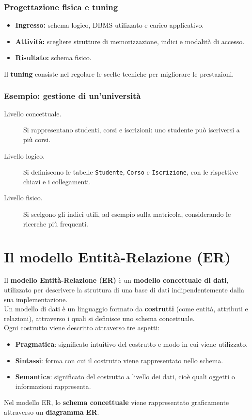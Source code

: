 \subsubsection{Progettazione fisica e tuning}

\begin{itemize}
    \item \textbf{Ingresso:} schema logico, DBMS utilizzato
    e carico applicativo.
    \item \textbf{Attività:} scegliere strutture di memorizzazione,
    indici e modalità di accesso.
    \item \textbf{Risultato:} schema fisico.
\end{itemize}

\noindent
Il \textbf{tuning} consiste nel regolare le scelte tecniche
per migliorare le prestazioni.

\subsubsection{Esempio: gestione di un'università}

\begin{description}
    \item[Livello concettuale.]
    Si rappresentano studenti, corsi e iscrizioni:
    uno studente può iscriversi a più corsi.

    \item[Livello logico.]
    Si definiscono le tabelle
    \texttt{Studente}, \texttt{Corso} e \texttt{Iscrizione},
    con le rispettive chiavi e i collegamenti.

    \item[Livello fisico.]
    Si scelgono gli indici utili, ad esempio sulla matricola,
    considerando le ricerche più frequenti.
\end{description}

\section{Il modello Entità-Relazione (ER)}

Il \textbf{modello Entità-Relazione (ER)} è un \textbf{modello concettuale di dati}, utilizzato per descrivere la struttura di una base di dati indipendentemente dalla sua implementazione.\\
Un modello di dati è un linguaggio formato da \textbf{costrutti} (come entità, attributi e relazioni), attraverso i quali si definisce uno schema concettuale.\\
Ogni costrutto viene descritto attraverso tre aspetti:
\begin{itemize}
    \item \textbf{Pragmatica}: significato intuitivo del costrutto e modo in cui viene utilizzato.
    \item \textbf{Sintassi}: forma con cui il costrutto viene rappresentato nello schema.
    \item \textbf{Semantica}: significato del costrutto a livello dei dati, cioè quali oggetti o informazioni rappresenta.
\end{itemize}
\noindent Nel modello ER, lo \textbf{schema concettuale} viene rappresentato graficamente attraverso un \textbf{diagramma ER}.

